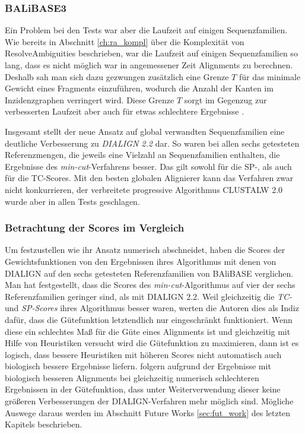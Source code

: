 \subsubsection{BALiBASE3}

Ein Problem bei den Tests war aber die Laufzeit auf einigen Sequenzfamilien. Wie bereits in Abschnitt \ref{ch:ra_kompl} über die Komplexität von \textrm{ResolveAmbiguities} beschrieben, war die Laufzeit auf einigen Sequenzfamilien so lang, dass es nicht möglich war in angemessener Zeit Alignments zu berechnen. Deshalb sah man sich dazu gezwungen zusätzlich eine Grenze $T$ für das minimale Gewicht eines Fragments einzuführen, wodurch die Anzahl der Kanten im Inzidenzgraphen verringert wird. Diese Grenze $T$ sorgt im Gegenzug zur verbesserten Laufzeit aber auch für etwas schlechtere Ergebnisse \citep{cpm10}.

Insgesamt stellt der neue Ansatz auf global verwandten Sequenzfamilien eine deutliche Verbesserung zu \emph{DIALIGN 2.2} dar. So waren bei allen sechs getesteten Referenzmengen, die jeweils eine Vielzahl an Sequenzfamilien enthalten, die Ergebnisse des \emph{min-cut}-Verfahrens besser. Das gilt sowohl für die SP-, als auch für die TC-Scores. Mit den besten globalen Alignierer kann das Verfahren zwar nicht konkurrieren, der verbreitete progressive Algorithmus CLUSTALW 2.0 wurde aber in allen Tests geschlagen. 

\subsubsection{Betrachtung der Scores im Vergleich}

Um festzustellen wie ihr Ansatz numerisch abschneidet, haben \cite{cpm10} die Scores der Gewichtsfunktionen von den Ergebnissen ihres Algorithmus mit denen von DIALIGN auf den sechs getesteten Referenzfamilien von BAliBASE verglichen. Man hat festgestellt, dass die Scores des \emph{min-cut}-Algorithmus auf vier der sechs Referenzfamilien geringer sind, als mit DIALIGN 2.2. Weil gleichzeitig die \emph{TC-} und \emph{SP-Scores} ihres Algorithmus besser waren, werten die Autoren dies als Indiz dafür, dass die Gütefunktion letztendlich nur eingeschränkt funktioniert. Wenn diese ein schlechtes Maß für die Güte eines Alignments ist und gleichzeitig mit Hilfe von Heuristiken versucht wird die Gütefunktion zu maximieren, dann ist es logisch, dass bessere Heuristiken mit höheren Scores nicht automatisch auch biologisch bessere Ergebnisse liefern. \cite{cpm10} folgern aufgrund der Ergebnisse mit biologisch besseren Alignments bei gleichzeitig numerisch schlechteren Ergebnissen in der Gütefunktion, dass unter Weiterverwendung dieser keine größeren Verbesserungen der DIALIGN-Verfahren mehr möglich sind. Mögliche Auswege daraus werden im Abschnitt Future Works \ref{sec:fut_work} des letzten Kapitels beschrieben.

